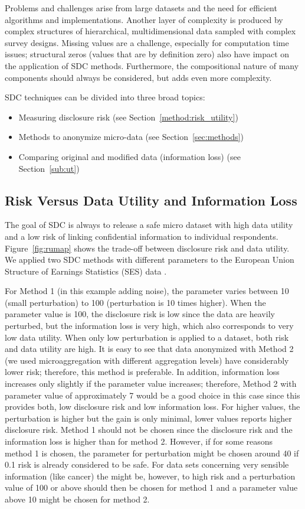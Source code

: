 \documentclass[12pt]{scrartcl}\usepackage[]{graphicx}\usepackage[]{color}
\begin{document}
Problems and challenges arise from large datasets and the need for efficient algorithms and implementations. Another layer of complexity is produced by complex structures of hierarchical, multidimensional data sampled with complex survey designs. Missing values are a challenge, especially for computation time issues; structural zeros (values that are by definition zero) also have impact on the application of SDC methods. Furthermore, the compositional nature of many components should always be considered, but adds even more complexity.

SDC techniques can be divided into three broad topics:
\begin{itemize}
\item Measuring disclosure risk  (see Section~\ref{method:risk_utility})
\item Methods to anonymize micro-data   (see Section~\ref{sec:methods})
\item Comparing original and modified data (information loss) (see Section~\ref{sub:ut})
\end{itemize}

\subsection{Risk Versus Data Utility and Information Loss}
The goal of SDC is always to release a safe micro dataset with high data utility and a low risk of linking confidential information to individual respondents. Figure~\ref{fig:rumap} shows the trade-off between disclosure risk and data utility. We applied two SDC methods with different parameters to the European Union Structure of Earnings Statistics (SES) data \citep[see][for more on anonymization of this dataset]{caseStudies}.

For Method 1 (in this example adding noise), the parameter varies between 10 (small perturbation) to 100 (perturbation is 10 times higher). When the parameter value is 100, the disclosure risk is low since the data are heavily perturbed, but the information loss is very high, which also corresponds to very low data utility. When only low perturbation is applied to a dataset, both risk and data utility are high. It is easy to see that data anonymized with Method 2 (we used microaggregation with different aggregation levels) have considerably lower risk; therefore, this method is preferable. In addition, information loss increases only slightly if the parameter value increases; therefore, Method 2  with parameter value of approximately 7 would be a good choice in this case since this provides both, low disclosure risk and low information loss. For higher values, the perturbation is higher but the gain is only minimal, lower values reports higher disclosure risk. Method 1 should not be chosen since the disclosure risk and the information loss is higher than for method 2. However, if for some reasons method 1 is chosen, the parameter for perturbation might be chosen around 40 if 0.1 risk is already considered to be safe. For data sets concerning very sensible information (like cancer) the might be, however, to high risk and a perturbation value of 100 or above should then be chosen for method 1 and a parameter value above 10 might be chosen for method 2.
\end{document}
